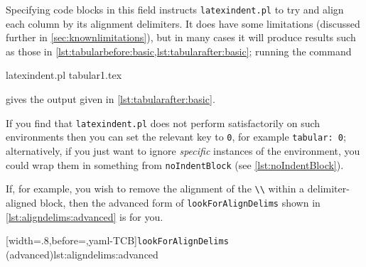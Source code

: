  Specifying code blocks in this field instructs \texttt{latexindent.pl} to try and align
 each column by its alignment delimiters. It does have some limitations (discussed
 further in \cref{sec:knownlimitations}), but in many cases it will produce results such
 as those in \cref{lst:tabularbefore:basic,lst:tabularafter:basic}; running the command

 \begin{commandshell}
latexindent.pl tabular1.tex   
 \end{commandshell}

 gives the output given in \cref{lst:tabularafter:basic}.

 \begin{cmhtcbraster}
 \end{cmhtcbraster}

 If you find that \texttt{latexindent.pl} does not perform satisfactorily on such
 environments then you can set the relevant key to \texttt{0}, for example
 \texttt{tabular: 0}; alternatively, if you just want to ignore \emph{specific} instances
 of the environment, you could wrap them in something from \texttt{noIndentBlock} (see
 \vref{lst:noIndentBlock}).

 If, for example, you wish to remove the alignment of the \lstinline!\\! within a
 delimiter-aligned block, then the advanced form of \texttt{lookForAlignDelims} shown in
 \cref{lst:aligndelims:advanced} is for you. 
    

 [width=.8\linewidth,before=\centering,yaml-TCB]{\texttt{lookForAlignDelims} (advanced)}{lst:aligndelims:advanced}

